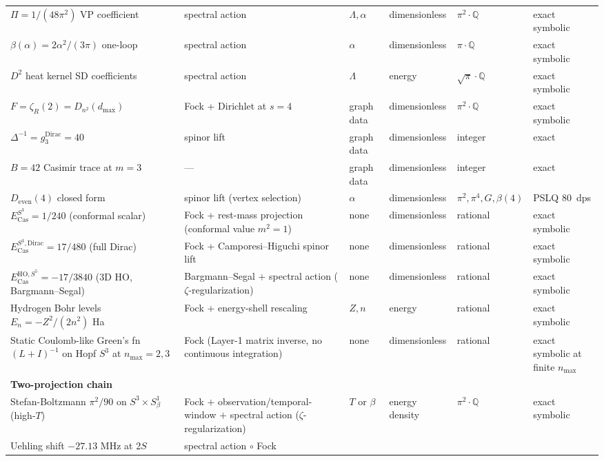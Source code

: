 \documentclass[11pt]{article}
\begin{document}
\begin{longtable}{p{3.5cm} p{2.8cm} p{1.3cm} p{2.2cm} p{1.8cm} p{1.4cm}}
$\Pi = 1/(48\pi^2)$ VP coefficient & spectral action &
$\Lambda, \alpha$ & dimensionless & $\pi^2{\cdot}\mathbb{Q}$ &
exact symbolic \\
$\beta(\alpha) = 2\alpha^2/(3\pi)$ one-loop & spectral action &
$\alpha$ & dimensionless & $\pi{\cdot}\mathbb{Q}$ & exact symbolic \\
$D^2$ heat kernel SD coefficients & spectral action & $\Lambda$ &
energy & $\sqrt{\pi}{\cdot}\mathbb{Q}$ & exact symbolic \\
$F = \zeta_R(2) = D_{n^2}(d_\text{max})$ & Fock + Dirichlet at
$s=4$ & graph data & dimensionless & $\pi^2{\cdot}\mathbb{Q}$ &
exact symbolic \\
$\Delta^{-1} = g_3^\text{Dirac} = 40$ & spinor lift & graph data &
dimensionless & integer & exact \\
$B = 42$ Casimir trace at $m=3$ & --- & graph data &
dimensionless & integer & exact \\
$D_\text{even}(4)$ closed form & spinor lift (vertex selection) &
$\alpha$ & dimensionless & $\pi^2, \pi^4, G, \beta(4)$ & PSLQ 80~dps \\
$E_\text{Cas}^{S^3} = 1/240$ (conformal scalar) & Fock + rest-mass
projection (conformal value $m^2 = 1$) & none & dimensionless &
rational & exact symbolic \\
$E_\text{Cas}^{S^3, \text{Dirac}} = 17/480$ (full Dirac) & Fock +
Camporesi--Higuchi spinor lift & none & dimensionless & rational &
exact symbolic \\
$E_\text{Cas}^{\text{HO}, S^5} = -17/3840$ (3D HO, Bargmann--Segal) &
Bargmann--Segal $+$ spectral action ($\zeta$-regularization) & none &
dimensionless & rational & exact symbolic \\
Hydrogen Bohr levels $E_n = -Z^2/(2n^2)$ Ha & Fock $+$ energy-shell
rescaling & $Z, n$ & energy & rational & exact symbolic \\
Static Coulomb-like Green's fn $(L+I)^{-1}$ on Hopf $S^3$ at
$n_\text{max} = 2, 3$ & Fock (Layer-1 matrix inverse, no continuous
integration) & none & dimensionless & rational & exact symbolic at
finite $n_\text{max}$ \\
\midrule
\textbf{Two-projection chain} & & & & & \\
Stefan-Boltzmann $\pi^2/90$ on $S^3 \times S^1_\beta$ (high-$T$) &
Fock $+$ observation/temporal-window $+$ spectral action
($\zeta$-regularization) & $T$ or $\beta$ & energy density &
$\pi^2 \cdot \mathbb{Q}$ & exact symbolic \\
Uehling shift $-27.13$ MHz at 2$S$ & spectral action $\circ$ Fock &

\end{longtable}
\end{document}
